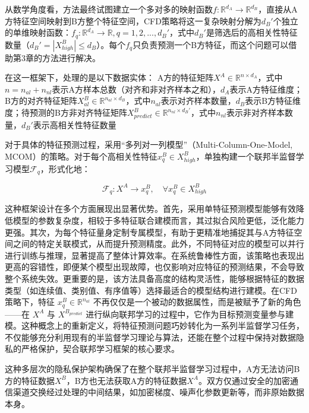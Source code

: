 从数学角度看，方法最终试图建立一个多对多的映射函数$f: \mathbb{R}^{d_A} \rightarrow \mathbb{R}^{d_B}$，直接从A方特征空间映射到B方整个特征空间，CFD策略将这一复杂映射分解为$d_B'$个独立的单维映射函数：$f_q: \mathbb{R}^{d_A} \rightarrow \mathbb{R}, q = 1, 2, ..., d_B'$，式中$d_B'$是筛选后的高相关性特征数量（$d_B' = |X^B_{high}| \leq d_B$）。每个$f_q$只负责预测一个B方特征，而这个问题可以借助第3章的方法进行解决。

在这一框架下，处理的是以下数据实体：
A方的特征矩阵$X^A \in \mathbb{R}^{n \times d_A}$，式中$n = n_{al} + n_{nl}$表示A方样本总数（对齐和非对齐样本之和），$d_A$表示A方特征维度； B方的对齐特征矩阵$X^B_{al} \in \mathbb{R}^{n_{al} \times d_B}$，式中$n_{al}$表示对齐样本数量，$d_B$表示B方特征维度；待预测的B方非对齐特征矩阵$X^B_{predict} \in \mathbb{R}^{n_{nl} \times d_B'}$，式中$n_{nl}$表示非对齐样本数量，$d_B'$表示高相关性特征数量

对于具体的特征预测过程，采用“多列对一列模型”（Multi-Column-One-Model, MCOM）的策略。对于每个高相关性特征$x^B_q \in X^B_{high}$，单独构建一个联邦半监督学习模型$\mathcal{F}_q$，形式化地：

\begin{equation}
	\mathcal{F}_q: X^A \rightarrow x^B_q, \quad \forall x^B_q \in X^B_{high}
\end{equation}


这种框架设计在多个方面展现出显著优势。首先，采用单特征预测模型能够有效降低模型的参数复杂度，相较于多特征联合建模而言，其过拟合风险更低，泛化能力更强。其次，为每个特征量身定制专属模型，有助于更精准地捕捉其与A方特征空间之间的特定关联模式，从而提升预测精度。此外，不同特征对应的模型可以并行进行训练与推理，显著提高了整体计算效率。在系统鲁棒性方面，该策略也表现出更高的容错性，即便某个模型出现故障，也仅影响对应特征的预测结果，不会导致整个系统失效。更重要的是，该方法具备高度的结构灵活性，能够根据特征的数据类型（如连续值、类别值、有序值等）选择最适合的模型结构进行建模。在CFD策略下，特征 $x^B_q \in \mathbb{R}^{n_{al}}$ 不再仅仅是一个被动的数据属性，而是被赋予了新的角色——在 $X^A$ 与 $X^{B_{predict}}$ 进行纵向联邦学习的过程中，它作为目标预测变量参与建模。这种概念上的重新定义，将特征预测问题巧妙转化为一系列半监督学习任务，不仅能够充分利用现有的半监督学习理论与算法，还能在整个过程中保持对数据隐私的严格保护，契合联邦学习框架的核心要求。

这种多层次的隐私保护架构确保了在整个联邦半监督学习过程中，A方无法访问B方的特征数据$X^B$，B方也无法获取A方的特征数据$X^A$。双方仅通过安全的加密通信渠道交换经过处理的中间结果，如加密梯度、噪声化参数更新等，而非原始数据本身。

